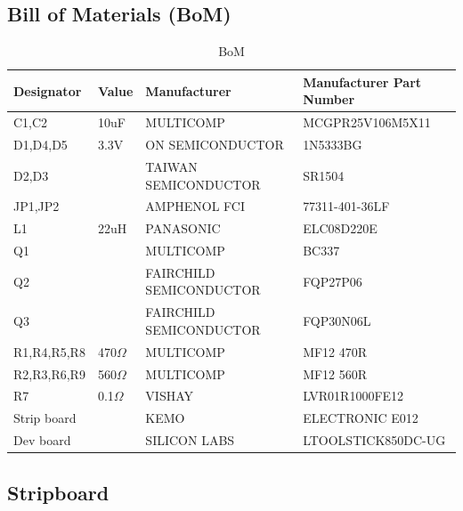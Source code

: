 \documentclass[12pt]{article}%
\begin{document}
\subsection{Bill of Materials (BoM)}


\begin{table}[H]
   \centering
   \caption{BoM}
   \label{tab:bom}
   \begin{tabular}{|p{2.5cm}|p{1.2cm}|p{7cm}|p{5cm}|}
   \hline
      	\textbf{Designator}        	& 	\textbf{Value}	&	\textbf{Manufacturer}   		&  	\textbf{Manufacturer Part Number}	\\ \hline
	C1,C2				&	10uF			&	 MULTICOMP				&	MCGPR25V106M5X11			\\ \hline
	D1,D4,D5			&	3.3V			&	ON SEMICONDUCTOR		&	1N5333BG					\\ \hline
	D2,D3				&				&	TAIWAN SEMICONDUCTOR	&	SR1504					\\ \hline
	JP1,JP2			&				&	AMPHENOL FCI	&	77311-401-36LF					\\ \hline
	L1				&	22uH			&	PANASONIC 	&	ELC08D220E			\\ \hline
	Q1				&				& 	MULTICOMP	                              &      BC337		\\ \hline
	Q2				&			&	FAIRCHILD SEMICONDUCTOR	&	FQP27P06		\\ \hline
	Q3				&		&	FAIRCHILD SEMICONDUCTOR	&	FQP30N06L	\\ \hline
	R1,R4,R5,R8		&	470$\Omega$		&	MULTICOMP	&	MF12 470R	\\ \hline
	R2,R3,R6,R9		&	560$\Omega$		&	MULTICOMP	&	MF12 560R	\\ \hline
	R7		&	0.1$\Omega$		&	VISHAY	&  LVR01R1000FE12	\\ \hline
	Strip board		&		&	KEMO & ELECTRONIC	E012	\\ \hline
	Dev board		&		&	SILICON LABS	&  LTOOLSTICK850DC-UG	\\ \hline

   \end{tabular}
\end{table}


\subsection{Stripboard}
\end{document}
